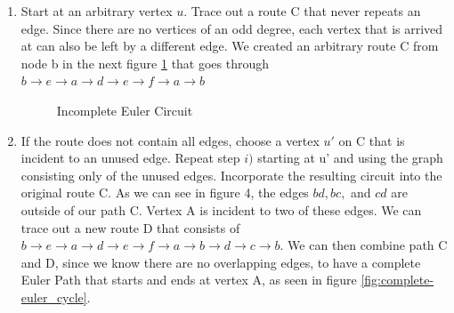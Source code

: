 \documentclass[14pt, times, a4paper]{extarticle}
\begin{document}
\begin{enumerate}[label=(\roman*)]

    \item Start at an arbitrary vertex $u$. Trace out a route C that never repeats an edge. Since there are no vertices of an odd degree, each vertex that is arrived at can also be left by a different edge. We created an arbitrary route C from node b in the next figure \ref{fig:failed-euler-cycle} that goes through $b \!\rightarrow\! e \!\rightarrow\! a \!\rightarrow\! d \!\rightarrow\! e \!\rightarrow\! f \!\rightarrow\! a\!\rightarrow\! b$

    \begin{center}
    \begin{figure}[H]
        \centering
    \caption{Incomplete Euler Circuit}
        \label{fig:failed-euler-cycle}
    \end{figure}
    \end{center}
    


    \item If the route does not contain all edges, choose a vertex $u'$  on C that is incident to an unused edge. Repeat step $i)$ starting at u’ and using the graph consisting only of the unused edges. Incorporate the resulting circuit into the original route C. As we can see in figure 4, the edges $bd, bc,$ and $cd$ are outside of our path C. Vertex A is incident to two of these edges. We can trace out a new route D that consists of\\ $b \!\rightarrow\! e \!\rightarrow\! a \!\rightarrow\! d \!\rightarrow\! e \!\rightarrow\! f \!\rightarrow\! a\!\rightarrow\! b\!\rightarrow\! d\!\rightarrow\! c\!\rightarrow\! b$. We can then combine path C and D, since we know there are no overlapping edges, to have a complete Euler Path that starts and ends at vertex A, as seen in figure \ref{fig:complete-euler_cycle}. 


\end{enumerate}
\end{document}
